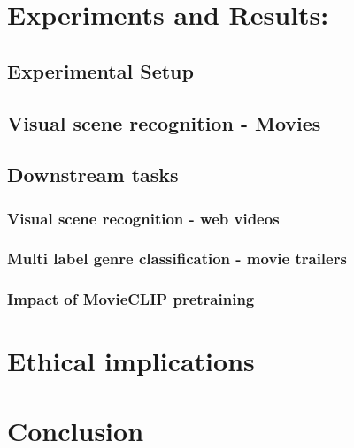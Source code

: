 \section{Experiments and Results:}
\subsection{Experimental Setup}
\subsection{Visual scene recognition - Movies}
\subsection{Downstream tasks}
\subsubsection{Visual scene recognition - web videos}
\subsubsection{Multi label genre classification - movie trailers}
\subsubsection{Impact of MovieCLIP pretraining}
\section{Ethical implications}
\section{Conclusion}
 

    
\Blindtext[2]
